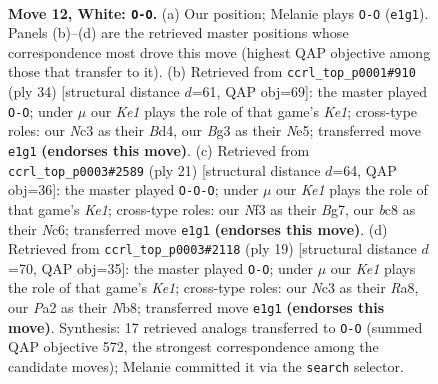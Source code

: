 \documentclass[11pt]{article}
\begin{document}
\clearpage

\begin{figure}[p]\centering
\begin{subfigure}{0.46\textwidth}\centering
\resizebox{\linewidth}{!}{%
\newchessgame
\chessboard[
  setfen={rnbr2k1/pp3p2/4pn1p/2b3p1/2B5/2N1PNB1/PP3PPP/R3K2R w KQ - 0 12},
  showmover=false,
  pgfstyle=straightmove, color=movearrow, markmove={e1-g1}
]}
\caption{}
\end{subfigure}\hfill
\begin{subfigure}{0.46\textwidth}\centering
\resizebox{\linewidth}{!}{%
\newchessgame
\chessboard[
  setfen={r3kb1r/1p3pp1/p3pn2/4Nb2/2BB3p/2P2P1P/PP4P1/R3K2R w KQkq - 0 18},
  showmover=false,
  pgfstyle=straightmove, color=movearrow, markmove={e1-g1}
]}
\caption{}
\end{subfigure}
\\[4pt]
\begin{subfigure}{0.46\textwidth}\centering
\resizebox{\linewidth}{!}{%
\newchessgame
\chessboard[
  setfen={r3k2r/ppp1ppbp/2n1b3/8/8/2P1BN2/PP3PPP/R2BK2R b KQkq - 0 11},
  showmover=false,
  pgfstyle=straightmove, color=movearrow, markmove={e8-c8}
]}
\caption{}
\end{subfigure}\hfill
\begin{subfigure}{0.46\textwidth}\centering
\resizebox{\linewidth}{!}{%
\newchessgame
\chessboard[
  setfen={rnb1k2r/1p3ppp/p3pn2/2b5/8/4PN2/PP2BPPP/RNBR2K1 b kq - 1 10},
  showmover=false,
  pgfstyle=straightmove, color=movearrow, markmove={e8-g8}
]}
\caption{}
\end{subfigure}
\caption{\textbf{Move 12, White: \texttt{O-O}.} (a) Our position; Melanie plays \texttt{O-O} (\texttt{e1g1}). Panels (b)--(d) are the retrieved master positions whose correspondence most drove this move (highest QAP objective among those that transfer to it). (b) Retrieved from \texttt{ccrl\_top\_p0001\#910} (ply 34) [structural distance $d$=61, QAP obj=69]: the master played \texttt{O-O}; under $\mu$ our \emph{Ke1} plays the role of that game's \emph{Ke1}; cross-type roles: our \emph{N}c3 as their \emph{B}d4, our \emph{B}g3 as their \emph{N}e5; transferred move \texttt{e1g1} \textbf{(endorses this move)}. (c) Retrieved from \texttt{ccrl\_top\_p0003\#2589} (ply 21) [structural distance $d$=64, QAP obj=36]: the master played \texttt{O-O-O}; under $\mu$ our \emph{Ke1} plays the role of that game's \emph{Ke1}; cross-type roles: our \emph{N}f3 as their \emph{B}g7, our \emph{b}c8 as their \emph{N}c6; transferred move \texttt{e1g1} \textbf{(endorses this move)}. (d) Retrieved from \texttt{ccrl\_top\_p0003\#2118} (ply 19) [structural distance $d$=70, QAP obj=35]: the master played \texttt{O-O}; under $\mu$ our \emph{Ke1} plays the role of that game's \emph{Ke1}; cross-type roles: our \emph{N}c3 as their \emph{R}a8, our \emph{P}a2 as their \emph{N}b8; transferred move \texttt{e1g1} \textbf{(endorses this move)}. Synthesis: 17 retrieved analogs transferred to \texttt{O-O} (summed QAP objective 572, the strongest correspondence among the candidate moves); Melanie committed it via the \texttt{search} selector.}
\label{fig:thought-m22}
\end{figure}
\end{document}
